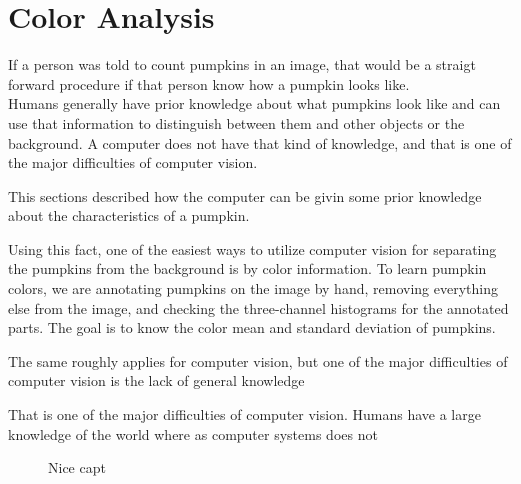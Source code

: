 \documentclass[../Head/Main.tex]{subfiles}
\begin{document}
\section{Color Analysis}

If a person was told to count pumpkins in an image, that would be a straigt forward procedure if that person know how a pumpkin looks like.\\
Humans generally have prior knowledge about what pumpkins look like and can use that information to distinguish between them and other objects or the background.
A computer does not have that kind of knowledge, and that is one of the major difficulties of computer vision.\par
This sections described how the computer can be givin some prior knowledge about the characteristics of a pumpkin. 

Using this fact, one of the easiest ways to utilize computer vision for separating the pumpkins from the background is by color information.
To learn pumpkin colors, we are annotating pumpkins on the image by hand, removing everything else from the image, and checking the three-channel histograms for the annotated parts.
The goal is to know the color mean and standard deviation of pumpkins.


The same roughly applies for computer vision, but one of the major difficulties of computer vision is the lack of general knowledge


That is one of the major difficulties of computer vision. Humans have a large knowledge of the world where as computer systems does not




\begin{figure}[H]
	\centering
	\scalebox{0.9}{
	}
	\caption{Nice capt}
	\label{fig:color_mean}
\end{figure}
\end{document}
